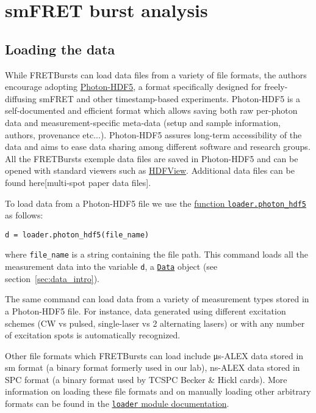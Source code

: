 \section{smFRET burst analysis}
\label{sec:analysis}

\subsection{Loading the data}
\label{sec:dataload}

While FRETBursts can load data files from a variety of file formats,
the authors encourage adopting \href{http://photon-hdf5.readthedocs.org/}{Photon-HDF5},
a format specifically designed for freely-diffusing smFRET and other timestamp-based experiments.
Photon-HDF5 is a self-documented and efficient format
which allows saving both raw per-photon data and measurement-specific meta-data
(setup and sample information, authors, provenance etc...).
Photon-HDF5 assures long-term accessibility of the data and aims to ease data sharing
among different software and research groups.
All the FRETBursts exemple data files are saved in Photon-HDF5 and can be opened with
standard viewers such as \href{http://www.hdfgroup.org/products/java/hdfview/}{HDFView}.
Additional data files can be found here[multi-spot paper data files].

To load data from a Photon-HDF5 file we use the
\href{http://fretbursts.readthedocs.org/en/latest/loader.html#fretbursts.loader.photon_hdf5}{function \texttt{loader.photon\_hdf5}} as follows:

\begin{verbatim}
d = loader.photon_hdf5(file_name)
\end{verbatim}

where \verb|file_name| is a string containing the file path.
This command loads all the measurement data into the variable \verb|d|,
a \href{http://fretbursts.readthedocs.org/en/latest/data_class.html}{\texttt{Data}} object
(see section~\ref{sec:data_intro}).

The same command can load data from a variety of measurement types stored
in a Photon-HDF5 file. For instance, data generated using different excitation schemes
(CW vs pulsed, single-laser vs 2 alternating lasers) or with any number of excitation spots
is automatically recognized.

Other file formats which FRETBursts can load include μs-ALEX data stored in sm format
(a binary format formerly used in our lab),
ns-ALEX data stored in SPC format (a binary format used by TCSPC Becker \& Hickl cards).
More information on loading these file formats and on manually loading other arbitrary formats
can be found in the
\href{http://fretbursts.readthedocs.org/en/latest/loader.html}{\texttt{loader} module documentation}.


